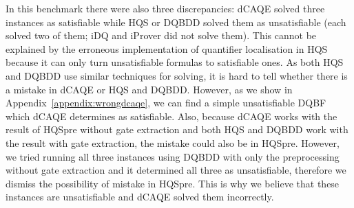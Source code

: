 \documentclass[
  digital, %
  color,
  twoside, %
  table,   %
  nolof,     %
  nolot,     %
]{fithesis3}
\theoremstyle{definition}
\theoremstyle{remark}
\begin{document}
In this benchmark there were also three discrepancies: dCAQE solved three instances as satisfiable while HQS or DQBDD solved them as unsatisfiable (each solved two of them; iDQ and iProver did not solve them). This cannot be explained by the erroneous implementation of quantifier localisation in HQS because it can only turn unsatisfiable formulas to satisfiable ones. As both HQS and DQBDD use similar techniques for solving, it is hard to tell whether there is a mistake in dCAQE or HQS and DQBDD. However, as we show in Appendix~\ref{appendix:wrongdcaqe}, we can find a simple unsatisfiable DQBF which dCAQE determines as satisfiable. Also, because dCAQE works with the result of HQSpre without gate extraction and both HQS and DQBDD work with the result with gate extraction, the mistake could also be in HQSpre. However, we tried running all three instances using DQBDD with only the preprocessing without gate extraction and it determined all three as unsatisfiable, therefore we dismiss the possibility of mistake in HQSpre. This is why we believe that these instances are unsatisfiable and dCAQE solved them incorrectly.
\end{document}
